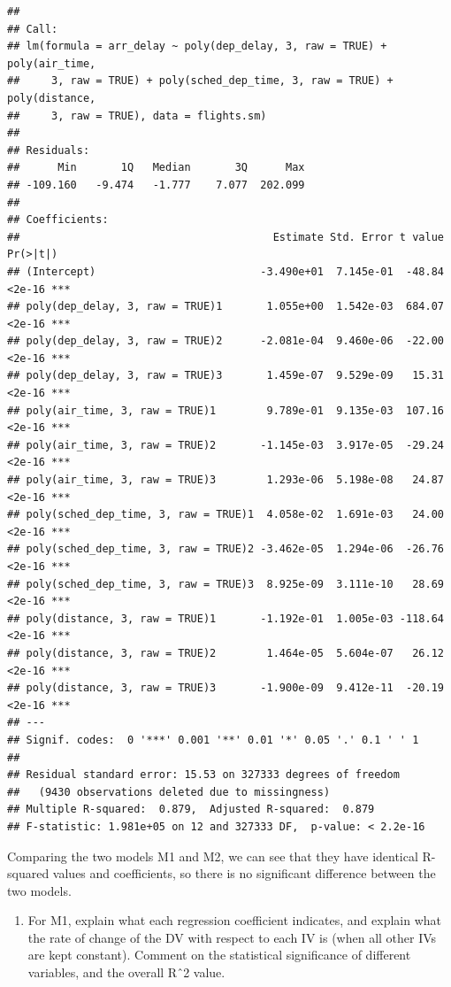 \documentclass[
]{article}
\providecommand{\tightlist}{%
  \setlength{\itemsep}{0pt}\setlength{\parskip}{0pt}}
\begin{document}
\begin{verbatim}
## 
## Call:
## lm(formula = arr_delay ~ poly(dep_delay, 3, raw = TRUE) + poly(air_time, 
##     3, raw = TRUE) + poly(sched_dep_time, 3, raw = TRUE) + poly(distance, 
##     3, raw = TRUE), data = flights.sm)
## 
## Residuals:
##      Min       1Q   Median       3Q      Max 
## -109.160   -9.474   -1.777    7.077  202.099 
## 
## Coefficients:
##                                        Estimate Std. Error t value Pr(>|t|)    
## (Intercept)                          -3.490e+01  7.145e-01  -48.84   <2e-16 ***
## poly(dep_delay, 3, raw = TRUE)1       1.055e+00  1.542e-03  684.07   <2e-16 ***
## poly(dep_delay, 3, raw = TRUE)2      -2.081e-04  9.460e-06  -22.00   <2e-16 ***
## poly(dep_delay, 3, raw = TRUE)3       1.459e-07  9.529e-09   15.31   <2e-16 ***
## poly(air_time, 3, raw = TRUE)1        9.789e-01  9.135e-03  107.16   <2e-16 ***
## poly(air_time, 3, raw = TRUE)2       -1.145e-03  3.917e-05  -29.24   <2e-16 ***
## poly(air_time, 3, raw = TRUE)3        1.293e-06  5.198e-08   24.87   <2e-16 ***
## poly(sched_dep_time, 3, raw = TRUE)1  4.058e-02  1.691e-03   24.00   <2e-16 ***
## poly(sched_dep_time, 3, raw = TRUE)2 -3.462e-05  1.294e-06  -26.76   <2e-16 ***
## poly(sched_dep_time, 3, raw = TRUE)3  8.925e-09  3.111e-10   28.69   <2e-16 ***
## poly(distance, 3, raw = TRUE)1       -1.192e-01  1.005e-03 -118.64   <2e-16 ***
## poly(distance, 3, raw = TRUE)2        1.464e-05  5.604e-07   26.12   <2e-16 ***
## poly(distance, 3, raw = TRUE)3       -1.900e-09  9.412e-11  -20.19   <2e-16 ***
## ---
## Signif. codes:  0 '***' 0.001 '**' 0.01 '*' 0.05 '.' 0.1 ' ' 1
## 
## Residual standard error: 15.53 on 327333 degrees of freedom
##   (9430 observations deleted due to missingness)
## Multiple R-squared:  0.879,  Adjusted R-squared:  0.879 
## F-statistic: 1.981e+05 on 12 and 327333 DF,  p-value: < 2.2e-16
\end{verbatim}

Comparing the two models M1 and M2, we can see that they have identical
R-squared values and coefficients, so there is no significant difference
between the two models.

\begin{enumerate}
\def\labelenumi{\alph{enumi}.}
\setcounter{enumi}{3}
\tightlist
\item
  For M1, explain what each regression coefficient indicates, and
  explain what the rate of change of the DV with respect to each IV is
  (when all other IVs are kept constant). Comment on the statistical
  significance of different variables, and the overall Rˆ2 value.
\end{enumerate}
\end{document}
